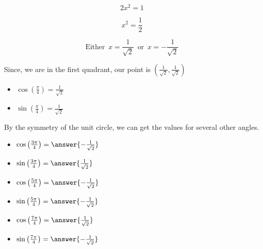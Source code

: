 \documentclass{ximera}
\begin{document}
\[  2  x^2 = 1 \]

\[  x^2 = \frac{1}{2} \]


\[  \text{Either } \, x = \frac{1}{\sqrt{2}} \, \text{ or } \,  x = -\frac{1}{\sqrt{2}}   \]


Since, we are in the first quadrant, our point is $\left(\frac{1}{\sqrt{2}}, \frac{1}{\sqrt{2}}\right)$


\begin{itemize}
\item $\cos\left(\frac{\pi}{4}\right) = \frac{1}{\sqrt{2}}$ 
\item $\sin\left(\frac{\pi}{4}\right) = \frac{1}{\sqrt{2}}$
\end{itemize}




By the symmetry of the unit circle, we can get the values for several other angles.




\begin{question}



\begin{itemize}
\item $\cos\left(\frac{3\pi}{4}\right) = \answer{-\frac{1}{\sqrt{2}}}$ 
\item $\sin\left(\frac{3\pi}{4}\right) = \answer{\frac{1}{\sqrt{2}}}$
\end{itemize}



\end{question}





\begin{question}



\begin{itemize}
\item $\cos\left(\frac{5\pi}{4}\right) = \answer{-\frac{1}{\sqrt{2}}}$ 
\item $\sin\left(\frac{5\pi}{4}\right) = \answer{-\frac{1}{\sqrt{2}}}$
\end{itemize}



\end{question}





\begin{question}



\begin{itemize}
\item $\cos\left(\frac{7\pi}{4}\right) = \answer{\frac{1}{\sqrt{2}}}$ 
\item $\sin\left(\frac{7\pi}{4}\right) = \answer{-\frac{1}{\sqrt{2}}}$
\end{itemize}



\end{question}
\end{document}
